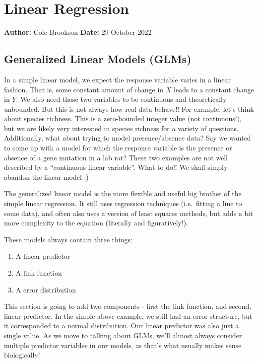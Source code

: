 \documentclass[
]{article}
\author{}
\date{\vspace{-2.5em}}
\providecommand{\tightlist}{%
  \setlength{\itemsep}{0pt}\setlength{\parskip}{0pt}}
\begin{document}
\hypertarget{linear-regression}{%
\section{Linear Regression}\label{linear-regression}}

\textbf{Author:} Cole Brookson \textbf{Date:} 29 October 2022

\hypertarget{generalized-linear-models-glms}{%
\subsection{Generalized Linear Models
(GLMs)}\label{generalized-linear-models-glms}}

In a simple linear model, we expect the response variable varies in a
linear fashion. That is, some constant amount of change in \(X\) leads
to a constant change in \(Y\). We also need those two variables to be
continuous and theoretically unbounded. But this is not always how real
data behave!! For example, let's think about species richness. This is a
zero-bounded integer value (not continuous!), but we are likely very
interested in species richness for a variety of questions. Additionally,
what about trying to model presence/absence data? Say we wanted to come
up with a model for which the response variable is the presence or
absence of a gene mutation in a lab rat? These two examples are not well
described by a ``continuous linear variable''. What to do!! We shall
simply abandon the linear model :)

The generalized linear model is the more flexible and useful big brother
of the simple linear regression. It still uses regression techniques
(i.e.~fitting a line to some data), and often also uses a version of
least squares methods, but adds a bit more complexity to the equation
(literally and figuratively!).

These models always contain three things:

\begin{enumerate}
\def\labelenumi{\arabic{enumi})}
\tightlist
\item
  A linear predictor
\item
  A link function
\item
  A error distribution
\end{enumerate}

This section is going to add two components - first the link function,
and second, linear predictor. In the simple above example, we still had
an error structure, but it corresponded to a normal distribution. Our
linear predictor was also just a single value. As we move to talking
about GLMs, we'll almost always consider multiple predictor variables in
our models, as that's what usually makes sense biologically!
\end{document}
